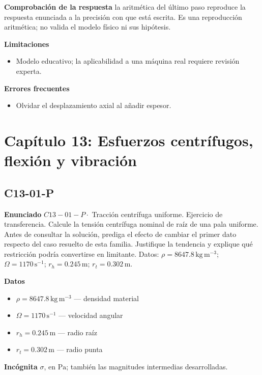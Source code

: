 \documentclass[10pt,openany]{book}
\begin{document}
\noindent\textbf{Comprobación de la respuesta} la aritmética del último paso reproduce la respuesta enunciada a la precisión con que está escrita. Es una reproducción aritmética; no valida el modelo físico ni sus hipótesis.

\noindent\textbf{Limitaciones}
\begin{itemize}
\item Modelo educativo; la aplicabilidad a una máquina real requiere revisión experta.
\end{itemize}

\noindent\textbf{Errores frecuentes}
\begin{itemize}
\item Olvidar el desplazamiento axial al añadir espesor.
\end{itemize}
\section{Capítulo 13: Esfuerzos centrífugos, flexión y vibración}
\subsection*{C13-01-P}

\noindent\textbf{Enunciado}
\(C13-01-P \cdot\) Tracción centrífuga uniforme. Ejercicio de transferencia. Calcule la tensión centrífuga nominal de raíz de una pala uniforme. Antes de consultar la solución, prediga el efecto de cambiar el primer dato respecto del caso resuelto de esta familia. Justifique la tendencia y explique qué restricción podría convertirse en limitante. Datos: \(\rho=8647.8\, \mathrm{kg}\,\mathrm{m}^{-3}\); \(\Omega=1170\, \mathrm{s}^{-1}\); \(r_h=0.245\, \mathrm{m}\); \(r_t=0.302\, \mathrm{m}\).

\noindent\textbf{Datos}
\begin{itemize}
\item $\rho = 8647.8\,\mathrm{kg}\,\mathrm{m}^{-3}$ — densidad material
\item $\Omega = 1170\,\mathrm{s}^{-1}$ — velocidad angular
\item $r_h = 0.245\,\mathrm{m}$ — radio raíz
\item $r_t = 0.302\,\mathrm{m}$ — radio punta
\end{itemize}

\noindent\textbf{Incógnita}
$\sigma$, en $\mathrm{Pa}$; también las magnitudes intermedias desarrolladas.
\end{document}
